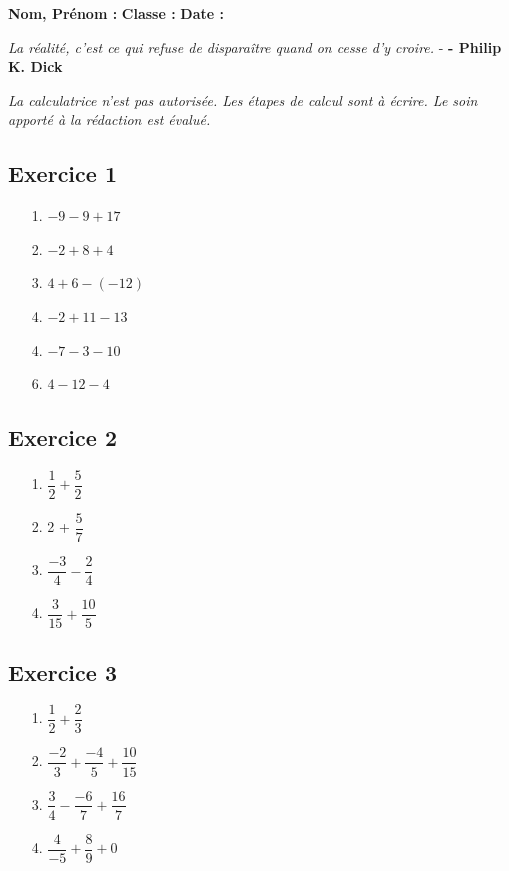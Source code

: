 \documentclass[12pt]{article}
\begin{document}

\textbf{Nom, Prénom :} \hspace{8cm} \textbf{Classe :} \hspace{3cm} \textbf{Date :}
\begin{center}
  \textit{La réalité, c'est ce qui refuse de disparaître quand on cesse d'y croire.}  - \textbf{ - Philip K. Dick}
\end{center}
\textit{La calculatrice n'est pas autorisée. Les étapes de calcul sont à écrire. Le soin apporté à la rédaction est évalué.}

\begin{multicols}{3}

\subsection*{Exercice 1} 

\begin{enumerate}
\item[1.] $-9 - 9 + 17 $
\item[2.] $-2 + 8 +4   $
\item[3.] $4 + 6 -(-12)$
\item[4.] $-2 + 11 - 13$
\item[4.] $-7 - 3 - 10 $
\item[6.] $4 - 12 - 4  $
\end{enumerate}

\subsection*{Exercice 2}


\begin{enumerate}
\item[1.] $\dfrac{1}{2} + \dfrac{5}{2}$
\item[2.] 2 + $\dfrac{5}{7}$
\item[3.] $\dfrac{-3}{4} - \dfrac{2}{4}$
\item[4.] $\dfrac{3}{15} + \dfrac{10}{5}$
\end{enumerate}



\subsection*{Exercice 3}

\begin{enumerate}
\item[1.] $\dfrac{1}{2} + \dfrac{2}{3}$
\item[2.] $\dfrac{-2}{3} + \dfrac{-4}{5} + \dfrac{10}{15}$
\item[3.] $\dfrac{3}{4} - \dfrac{-6}{7} + \dfrac{16}{7}$
\item[4.] $\dfrac{4}{-5} + \dfrac{8}{9} + 0$
\end{enumerate}

\end{multicols}
\end{document}
